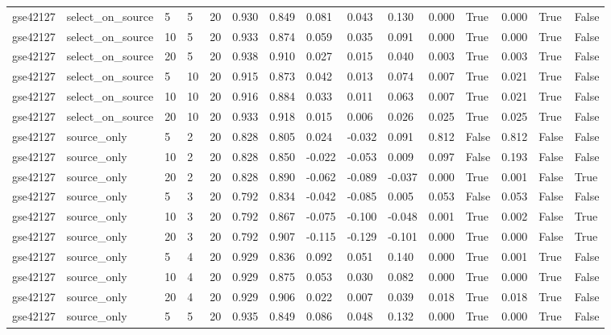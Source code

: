 \begin{table}[t]
\begin{tabular}{lllllllllllllll}
    gse42127 & select\_on\_source & 5 & 5 & 20 & 0.930 & 0.849 & 0.081 & 0.043 & 0.130 & 0.000 & True & 0.000 & True & False \\
    gse42127 & select\_on\_source & 10 & 5 & 20 & 0.933 & 0.874 & 0.059 & 0.035 & 0.091 & 0.000 & True & 0.000 & True & False \\
    gse42127 & select\_on\_source & 20 & 5 & 20 & 0.938 & 0.910 & 0.027 & 0.015 & 0.040 & 0.003 & True & 0.003 & True & False \\
    gse42127 & select\_on\_source & 5 & 10 & 20 & 0.915 & 0.873 & 0.042 & 0.013 & 0.074 & 0.007 & True & 0.021 & True & False \\
    gse42127 & select\_on\_source & 10 & 10 & 20 & 0.916 & 0.884 & 0.033 & 0.011 & 0.063 & 0.007 & True & 0.021 & True & False \\
    gse42127 & select\_on\_source & 20 & 10 & 20 & 0.933 & 0.918 & 0.015 & 0.006 & 0.026 & 0.025 & True & 0.025 & True & False \\
    gse42127 & source\_only & 5 & 2 & 20 & 0.828 & 0.805 & 0.024 & -0.032 & 0.091 & 0.812 & False & 0.812 & False & False \\
    gse42127 & source\_only & 10 & 2 & 20 & 0.828 & 0.850 & -0.022 & -0.053 & 0.009 & 0.097 & False & 0.193 & False & False \\
    gse42127 & source\_only & 20 & 2 & 20 & 0.828 & 0.890 & -0.062 & -0.089 & -0.037 & 0.000 & True & 0.001 & False & True \\
    gse42127 & source\_only & 5 & 3 & 20 & 0.792 & 0.834 & -0.042 & -0.085 & 0.005 & 0.053 & False & 0.053 & False & False \\
    gse42127 & source\_only & 10 & 3 & 20 & 0.792 & 0.867 & -0.075 & -0.100 & -0.048 & 0.001 & True & 0.002 & False & True \\
    gse42127 & source\_only & 20 & 3 & 20 & 0.792 & 0.907 & -0.115 & -0.129 & -0.101 & 0.000 & True & 0.000 & False & True \\
    gse42127 & source\_only & 5 & 4 & 20 & 0.929 & 0.836 & 0.092 & 0.051 & 0.140 & 0.000 & True & 0.001 & True & False \\
    gse42127 & source\_only & 10 & 4 & 20 & 0.929 & 0.875 & 0.053 & 0.030 & 0.082 & 0.000 & True & 0.000 & True & False \\
    gse42127 & source\_only & 20 & 4 & 20 & 0.929 & 0.906 & 0.022 & 0.007 & 0.039 & 0.018 & True & 0.018 & True & False \\
    gse42127 & source\_only & 5 & 5 & 20 & 0.935 & 0.849 & 0.086 & 0.048 & 0.132 & 0.000 & True & 0.000 & True & False \\

\end{tabular}
\end{table}
